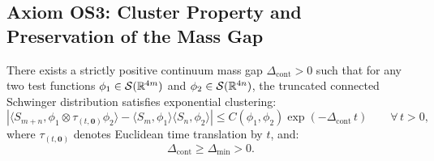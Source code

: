 \subsection{Axiom OS3: Cluster Property and Preservation of the Mass Gap}
\label{subsec:os3}

\begin{proposition}
\label{prop:os3}
There exists a strictly positive continuum mass gap $\Delta_{\mathrm{cont}} > 0$ such that for any two test functions $\phi_1 \in \mathcal{S}(\mathbb{R}^{4m})$ and $\phi_2 \in \mathcal{S}(\mathbb{R}^{4n})$, the truncated connected Schwinger distribution satisfies exponential clustering:
\begin{equation}
\label{eq:continuum_clustering_bound}
\left| \langle S_{m+n}, \phi_1 \otimes \tau_{(t, \mathbf{0})} \phi_2 \rangle - \langle S_m, \phi_1 \rangle \langle S_n, \phi_2 \rangle \right| \le C(\phi_1, \phi_2) \exp\left( -\Delta_{\mathrm{cont}} \, t \right) \qquad \forall \, t > 0,
\end{equation}
where $\tau_{(t, \mathbf{0})}$ denotes Euclidean time translation by $t$, and:
\begin{equation}
\label{eq:mass_gap_lower_bound_preservation}
\Delta_{\mathrm{cont}} \ge \Delta_{\min} > 0.
\end{equation}
\end{proposition}

